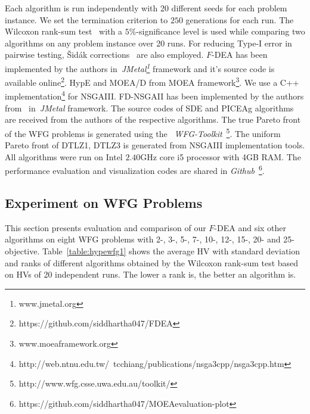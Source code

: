 \documentclass[review]{elsarticle}
\begin{document}


Each algorithm is run independently with 20 different seeds for each problem instance. We set the termination criterion to $250$ generations for each run. The Wilcoxon rank-sum test~\citep{haynes2013wilcoxon}
 with a $5\%$-significance level is used while comparing two algorithms on any problem instance over 20 runs. For reducing Type-I error in pairwise testing, {\v{S}}id{\'a}k corrections~\citep{abdi2007bonferonni} are also employed.
$F$-DEA has been implemented by the authors in~\textit{JMetal\footnote{www.jmetal.org\label{jmetal}}} framework and it's source code is available online\footnote{https://github.com/siddhartha047/FDEA}. HypE and MOEA/D  from MOEA framework\footnote{www.moeaframework.org\label{moeaframework}}. We use
a C++ implementation\footnote{http://web.ntnu.edu.tw/~tcchiang/publications/nsga3cpp/nsga3cpp.htm\label{nsgaiiilink}} for NSGAIII. FD-NSGAII has been implemented by the authors from~\citep{he2014fuzzy} in~\textit{JMetal} framework. The source codes of SDE and PICEAg algorithms are received from the authors of the respective algorithms. The true Pareto front of the WFG problems is generated using the ~\textit{WFG-Toolkit}~\footnote{http://www.wfg.csse.uwa.edu.au/toolkit/}.
The uniform Pareto front of DTLZ1, DTLZ3 is generated from NSGAIII implementation tools.
All algorithms were run on Intel $2.40$GHz core i5 processor with 4GB RAM. The performance evaluation and visualization codes are shared in \textit{Github}~\footnote{https://github.com/siddhartha047/MOEAevaluation-plot}.



\subsection{Experiment on WFG Problems}
This section presents evaluation and comparison of our $F$-DEA and six other algorithms on eight WFG problems with 2-, 3-, 5-, 7-, 10-,  12-, 15-,  20- and 25-objective.
Table~\ref{table:hypewfg1} shows the average HV with standard deviation and ranks of different algorithms obtained by the Wilcoxon rank-sum test based on HVs of 20 independent runs. The lower a rank is, the better an algorithm is. 
\end{document}
